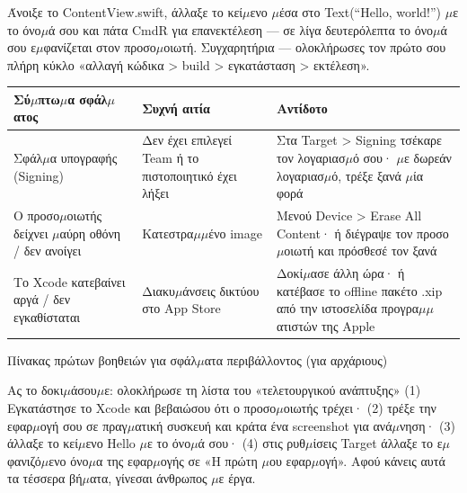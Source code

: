 Άνοιξε το ContentView.swift, άλλαξε το κεί$\mu$ενο $\mu$έσα στο Text(“Hello, world!”) $\mu$ε το όνο$\mu$ά σου και πάτα CmdR για επανεκτέλεση — σε λίγα δευτερόλεπτα το όνο$\mu$ά σου ε$\mu$φανίζεται στον προσο$\mu$οιωτή. Συγχαρητήρια — ολοκλήρωσες τον πρώτο σου πλήρη κύκλο «αλλαγή κώδικα > build > εγκατάσταση > εκτέλεση».

\begin{center}
\begin{tabularx}{\linewidth}{|X|X|X|}
\hline
\textbf{Σύ$\mu$πτω$\mu$α σφάλ$\mu$ατος} & \textbf{Συχνή αιτία} & \textbf{Αντίδοτο} \tabularnewline
\hline
Σφάλ$\mu$α υπογραφής (Signing) & Δεν έχει επιλεγεί Team ή το πιστοποιητικό έχει λήξει & Στα Target > Signing τσέκαρε τον λογαριασ$\mu$ό σου· $\mu$ε δωρεάν λογαριασ$\mu$ό, τρέξε ξανά $\mu$ία φορά \tabularnewline
Ο προσο$\mu$οιωτής δείχνει $\mu$αύρη οθόνη / δεν ανοίγει & Κατεστρα$\mu$$\mu$ένο image & Μενού Device > Erase All Content· ή διέγραψε τον προσο$\mu$οιωτή και πρόσθεσέ τον ξανά \tabularnewline
Το Xcode κατεβαίνει αργά / δεν εγκαθίσταται & Διακυ$\mu$άνσεις δικτύου στο App Store & Δοκί$\mu$ασε άλλη ώρα· ή κατέβασε το offline πακέτο .xip από την ιστοσελίδα προγρα$\mu$$\mu$ατιστών της Apple \tabularnewline
\hline
\end{tabularx}
\end{center}

\begin{center}\small\color{gray}Πίνακας πρώτων βοηθειών για σφάλ$\mu$ατα περιβάλλοντος (για αρχάριους)\end{center}

\begin{tcbpractice}{Ας το δοκι$\mu$άσου$\mu$ε: ολοκλήρωσε τη λίστα του «τελετουργικού ανάπτυξης»}
(1) Εγκατάστησε το Xcode και βεβαιώσου ότι ο προσο$\mu$οιωτής τρέχει· (2) τρέξε την εφαρ$\mu$ογή σου σε πραγ$\mu$ατική συσκευή και κράτα ένα screenshot για ανά$\mu$νηση· (3) άλλαξε το κεί$\mu$ενο Hello $\mu$ε το όνο$\mu$ά σου· (4) στις ρυθ$\mu$ίσεις Target άλλαξε το ε$\mu$φανιζό$\mu$ενο όνο$\mu$α της εφαρ$\mu$ογής σε «Η πρώτη $\mu$ου εφαρ$\mu$ογή». Αφού κάνεις αυτά τα τέσσερα βή$\mu$ατα, γίνεσαι άνθρωπος $\mu$ε έργα.

\end{tcbpractice}

